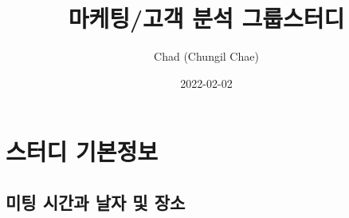 \documentclass[
]{book}
\title{마케팅/고객 분석 그룹스터디}
\author{Chad (Chungil Chae)}
\date{2022-02-02}
\begin{document}
\maketitle

{
\setcounter{tocdepth}{1}
\tableofcontents
}
\hypertarget{uxc2a4uxd130uxb514-uxae30uxbcf8uxc815uxbcf4}{%
\chapter{스터디 기본정보}\label{uxc2a4uxd130uxb514-uxae30uxbcf8uxc815uxbcf4}}

\hypertarget{uxbbf8uxd305-uxc2dcuxac04uxacfc-uxb0a0uxc790-uxbc0f-uxc7a5uxc18c}{%
\section{미팅 시간과 날자 및 장소}\label{uxbbf8uxd305-uxc2dcuxac04uxacfc-uxb0a0uxc790-uxbc0f-uxc7a5uxc18c}}
\end{document}

